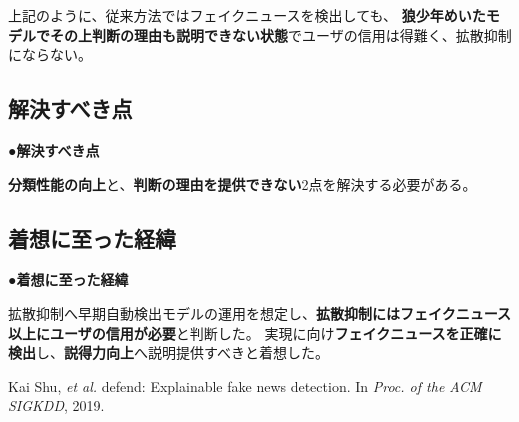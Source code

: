 {	上記のように、従来⽅法ではフェイクニュースを検出しても、
	\textbf{狼少年めいたモデルでその上判断の理由も説明できない状態}でユーザの信用は得難く、拡散抑制にならない。

	\subsection{解決すべき点}
	\noindent
	●\textbf{解決すべき点}

	\textbf{分類性能の向上}と、\textbf{判断の理由を提供できない}2点を解決する必要がある。

	\subsection{着想に至った経緯}
	\noindent
	●\textbf{着想に至った経緯}

	拡散抑制へ早期自動検出モデルの運用を想定し、\textbf{拡散抑制にはフェイクニュース以上にユーザの信用が必要}と判断した。
	実現に向け\textbf{フェイクニュースを正確に検出}し、\textbf{説得力向上}へ説明提供すべきと着想した。

	{\footnotesize
		\begin{thebibliography}{99}
			\vspace*{-1mm}
			\setlength{\parskip}{0cm}
			\setlength{\itemsep}{0cm}
			\setcounter{enumiv}{6}
			\begin{spacing}{0.7}
				 Kai Shu, \textit{et al.} defend: Explainable fake news detection. In \textit{Proc. of the ACM SIGKDD}, 2019.
			\end{spacing}
			\end{thebibliography}
			
	}
}

